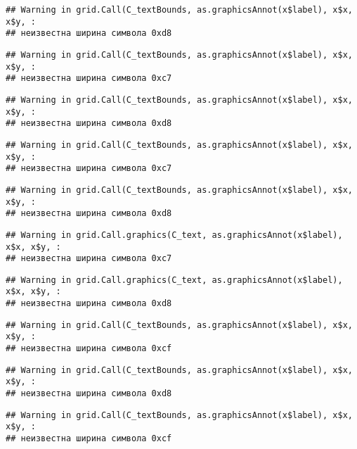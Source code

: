 \documentclass[
]{article}
\begin{document}
\begin{verbatim}
## Warning in grid.Call(C_textBounds, as.graphicsAnnot(x$label), x$x, x$y, :
## неизвестна ширина символа 0xd8
\end{verbatim}

\begin{verbatim}
## Warning in grid.Call(C_textBounds, as.graphicsAnnot(x$label), x$x, x$y, :
## неизвестна ширина символа 0xc7
\end{verbatim}

\begin{verbatim}
## Warning in grid.Call(C_textBounds, as.graphicsAnnot(x$label), x$x, x$y, :
## неизвестна ширина символа 0xd8
\end{verbatim}

\begin{verbatim}
## Warning in grid.Call(C_textBounds, as.graphicsAnnot(x$label), x$x, x$y, :
## неизвестна ширина символа 0xc7
\end{verbatim}

\begin{verbatim}
## Warning in grid.Call(C_textBounds, as.graphicsAnnot(x$label), x$x, x$y, :
## неизвестна ширина символа 0xd8
\end{verbatim}

\begin{verbatim}
## Warning in grid.Call.graphics(C_text, as.graphicsAnnot(x$label), x$x, x$y, :
## неизвестна ширина символа 0xc7
\end{verbatim}

\begin{verbatim}
## Warning in grid.Call.graphics(C_text, as.graphicsAnnot(x$label), x$x, x$y, :
## неизвестна ширина символа 0xd8
\end{verbatim}

\begin{verbatim}
## Warning in grid.Call(C_textBounds, as.graphicsAnnot(x$label), x$x, x$y, :
## неизвестна ширина символа 0xcf
\end{verbatim}

\begin{verbatim}
## Warning in grid.Call(C_textBounds, as.graphicsAnnot(x$label), x$x, x$y, :
## неизвестна ширина символа 0xd8
\end{verbatim}

\begin{verbatim}
## Warning in grid.Call(C_textBounds, as.graphicsAnnot(x$label), x$x, x$y, :
## неизвестна ширина символа 0xcf
\end{verbatim}
\end{document}
